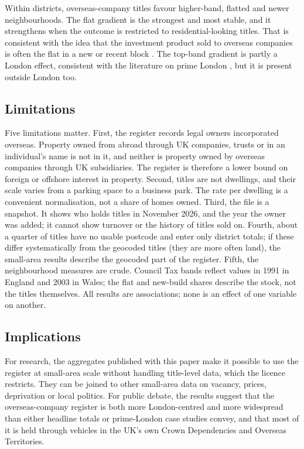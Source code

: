 \documentclass[11pt,a4paper]{article}
\begin{document}
Within districts, overseas-company titles favour higher-band, flatted and newer neighbourhoods. The flat gradient is the strongest and most stable, and it strengthens when the outcome is restricted to residential-looking titles. That is consistent with the idea that the investment product sold to overseas companies is often the flat in a new or recent block \citep{tiuk2017,bourne2022}. The top-band gradient is partly a London effect, consistent with the literature on prime London \citep{webber2016,burrows2017}, but it is present outside London too.

\subsection{Limitations}
Five limitations matter. First, the register records legal owners incorporated overseas. Property owned from abroad through UK companies, trusts or in an individual's name is not in it, and neither is property owned by overseas companies through UK subsidiaries. The register is therefore a lower bound on foreign or offshore interest in property. Second, titles are not dwellings, and their scale varies from a parking space to a business park. The rate per dwelling is a convenient normalisation, not a share of homes owned. Third, the file is a snapshot. It shows who holds titles in November 2026, and the year the owner was added; it cannot show turnover or the history of titles sold on. Fourth, about a quarter of titles have no usable postcode and enter only district totals; if these differ systematically from the geocoded titles (they are more often land), the small-area results describe the geocoded part of the register. Fifth, the neighbourhood measures are crude. Council Tax bands reflect values in 1991 in England and 2003 in Wales; the flat and new-build shares describe the stock, not the titles themselves. All results are associations; none is an effect of one variable on another.

\subsection{Implications}
For research, the aggregates published with this paper make it possible to use the register at small-area scale without handling title-level data, which the licence restricts. They can be joined to other small-area data on vacancy, prices, deprivation or local politics. For public debate, the results suggest that the overseas-company register is both more London-centred and more widespread than either headline totals or prime-London case studies convey, and that most of it is held through vehicles in the UK's own Crown Dependencies and Overseas Territories.
\end{document}
